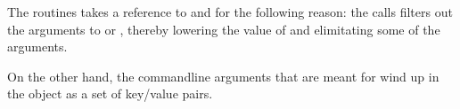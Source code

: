 The  routines takes a reference to 
and  for the following reason: the  calls
filters out the arguments to  or ,
thereby lowering the value of  and elimitating some of the 
arguments.

On the other hand, the commandline arguments that are meant for 
wind up in the  object as a set of key/value pairs.



